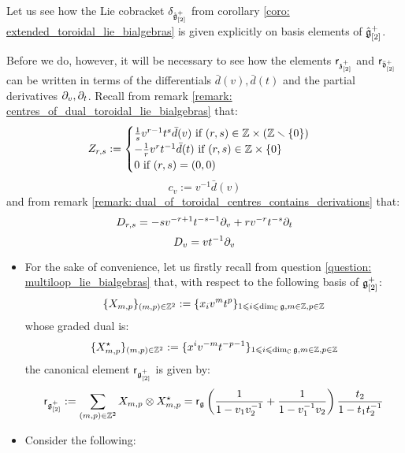            \begin{remark} \label{remark: extended_toroidal_lie_bialgebras_explicit_formulae}
                Let us see how the Lie cobracket $\delta_{\hat{\mathfrak{g}}_{[2]}^+}$ from corollary \ref{coro: extended_toroidal_lie_bialgebras} is given explicitly on basis elements of $\hat{\mathfrak{g}}_{[2]}^+$.

                Before we do, however, it will be necessary to see how the elements $\mathsf{r}_{\mathfrak{z}_{[2]}^+}$ and $\mathsf{r}_{\bar{\mathfrak{d}}_{[2]}^+}$ can be written in terms of the differentials $\bar{d}(v), \bar{d}(t)$ and the partial derivatives $\partial_v, \partial_t$. Recall from remark \ref{remark: centres_of_dual_toroidal_lie_bialgebras} that:
                    $$
                        Z_{r, s} :=
                        \begin{cases}
                            \text{$\frac1s v^{r - 1} t^s \bar{d}(v)$ if $(r, s) \in \Z \x (\Z \setminus \{0\})$}
                            \\
                            \text{$-\frac1r v^r t^{-1} \bar{d}(t)$ if $(r, s) \in \Z \x \{0\}$}
                            \\
                            \text{$0$ if $(r, s) = (0, 0)$}
                        \end{cases}
                    $$
                    $$c_v := v^{-1} \bar{d}(v)$$
                and from remark \ref{remark: dual_of_toroidal_centres_contains_derivations} that:
                    $$D_{r, s} = -s v^{-r + 1} t^{-s - 1} \partial_v + r v^{-r} t^{-s} \partial_t$$
                    $$D_v = v t^{-1} \partial_v$$
                \begin{itemize}
                    \item For the sake of convenience, let us firstly recall from question \ref{question: multiloop_lie_bialgebras} that, with respect to the following basis of $\mathfrak{g}_{[2]}^+$:
                        $$\{X_{m, p}\}_{(m, p) \in \mathbb{Z}^2} := \{x_i v^m t^p\}_{1 \leqslant i \leqslant \dim_{\mathbb{C}} \mathfrak{g}, m \in \mathbb{Z}, p \in \mathbb{Z}}$$
                    whose graded dual is:
                        $$\{X_{m, p}^{\star}\}_{(m, p) \in \mathbb{Z}^2} := \{x^i v^{-m} t^{-p - 1}\}_{1 \leqslant i \leqslant \dim_{\mathbb{C}} \mathfrak{g}, m \in \mathbb{Z}, p \in \mathbb{Z}}$$
                    the canonical element $\mathsf{r}_{\mathfrak{g}_{[2]}^+}$ is given by:
                        $$\sfr_{\g_{[2]}^+} := \sum_{(m, p) \in \Z^2} X_{m, p} \tensor X_{m, p}^{\star} = \sfr_{\g} \left( \frac{1}{1 - v_1 v_2^{-1}} + \frac{1}{1 - v_1^{-1} v_2} \right) \frac{t_2}{1 - t_1 t_2^{-1}}$$
                    \item Consider the following:

\end{itemize}
\end{remark}
